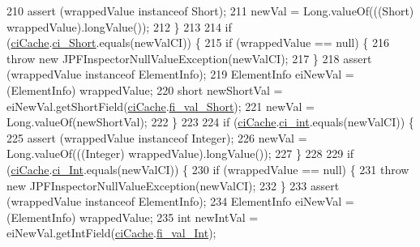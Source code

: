 \begin{DoxyCode}
210         assert (wrappedValue instanceof Short);
211         newVal = Long.valueOf(((Short) wrappedValue).longValue());
212       \}
213 
214       \textcolor{keywordflow}{if} (\hyperlink{classgov_1_1nasa_1_1jpf_1_1inspector_1_1server_1_1programstate_1_1_state_value_a38182b5018580765f3f2cdc9e96e1ca2}{ciCache}.\hyperlink{classgov_1_1nasa_1_1jpf_1_1inspector_1_1utils_1_1_class_info_cache_ab263ad66c64d7712f1835cb8e4914171}{ci\_Short}.equals(newValCI)) \{
215         \textcolor{keywordflow}{if} (wrappedValue == null) \{
216           \textcolor{keywordflow}{throw} \textcolor{keyword}{new} JPFInspectorNullValueException(newValCI);
217         \}
218         assert (wrappedValue instanceof ElementInfo);
219         ElementInfo eiNewVal = (ElementInfo) wrappedValue;
220         \textcolor{keywordtype}{short} newShortVal = eiNewVal.getShortField(\hyperlink{classgov_1_1nasa_1_1jpf_1_1inspector_1_1server_1_1programstate_1_1_state_value_a38182b5018580765f3f2cdc9e96e1ca2}{ciCache}.\hyperlink{classgov_1_1nasa_1_1jpf_1_1inspector_1_1utils_1_1_class_info_cache_afc6220bf5fcb698600f2865239641fab}{fi\_val\_Short});
221         newVal = Long.valueOf(newShortVal);
222       \}
223 
224       \textcolor{keywordflow}{if} (\hyperlink{classgov_1_1nasa_1_1jpf_1_1inspector_1_1server_1_1programstate_1_1_state_value_a38182b5018580765f3f2cdc9e96e1ca2}{ciCache}.\hyperlink{classgov_1_1nasa_1_1jpf_1_1inspector_1_1utils_1_1_class_info_cache_ae1f0dede5e0ce0e7e65305520ccc4814}{ci\_int}.equals(newValCI)) \{
225         assert (wrappedValue instanceof Integer);
226         newVal = Long.valueOf(((Integer) wrappedValue).longValue());
227       \}
228 
229       \textcolor{keywordflow}{if} (\hyperlink{classgov_1_1nasa_1_1jpf_1_1inspector_1_1server_1_1programstate_1_1_state_value_a38182b5018580765f3f2cdc9e96e1ca2}{ciCache}.\hyperlink{classgov_1_1nasa_1_1jpf_1_1inspector_1_1utils_1_1_class_info_cache_a3b473de6d927038466bee13b61c7cb47}{ci\_Int}.equals(newValCI)) \{
230         \textcolor{keywordflow}{if} (wrappedValue == null) \{
231           \textcolor{keywordflow}{throw} \textcolor{keyword}{new} JPFInspectorNullValueException(newValCI);
232         \}
233         assert (wrappedValue instanceof ElementInfo);
234         ElementInfo eiNewVal = (ElementInfo) wrappedValue;
235         \textcolor{keywordtype}{int} newIntVal = eiNewVal.getIntField(\hyperlink{classgov_1_1nasa_1_1jpf_1_1inspector_1_1server_1_1programstate_1_1_state_value_a38182b5018580765f3f2cdc9e96e1ca2}{ciCache}.\hyperlink{classgov_1_1nasa_1_1jpf_1_1inspector_1_1utils_1_1_class_info_cache_ae4ee1bec68b7401ac340b710a0571b7c}{fi\_val\_Int});

\end{DoxyCode}
